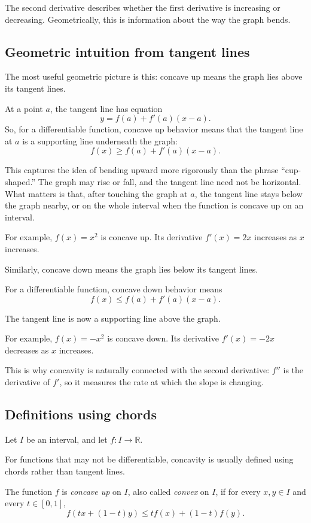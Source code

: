 \documentclass{essay}
\begin{document}
The second derivative describes whether the first derivative is increasing or decreasing. Geometrically, this is information about the way the graph bends.

\subsection{Geometric intuition from tangent lines}

The most useful geometric picture is this: concave up means the graph lies above its tangent lines.

At a point \(a\), the tangent line has equation
\[
y=f(a)+f'(a)(x-a).
\]
So, for a differentiable function, concave up behavior means that the tangent line at \(a\) is a supporting line underneath the graph:
\[
f(x)\geq f(a)+f'(a)(x-a).
\]

This captures the idea of bending upward more rigorously than the phrase ``cup-shaped.'' The graph may rise or fall, and the tangent line need not be horizontal. What matters is that, after touching the graph at \(a\), the tangent line stays below the graph nearby, or on the whole interval when the function is concave up on an interval.

For example, \(f(x)=x^2\) is concave up. Its derivative \(f'(x)=2x\) increases as \(x\) increases.

Similarly, concave down means the graph lies below its tangent lines.

For a differentiable function, concave down behavior means
\[
f(x)\leq f(a)+f'(a)(x-a).
\]

The tangent line is now a supporting line above the graph.

For example, \(f(x)=-x^2\) is concave down. Its derivative \(f'(x)=-2x\) decreases as \(x\) increases.

This is why concavity is naturally connected with the second derivative: \(f''\) is the derivative of \(f'\), so it measures the rate at which the slope is changing.

\subsection{Definitions using chords}

Let \(I\) be an interval, and let \(f:I\to\mathbb R\).

For functions that may not be differentiable, concavity is usually defined using chords rather than tangent lines.

The function \(f\) is \emph{concave up} on \(I\), also called \emph{convex} on \(I\), if for every \(x,y\in I\) and every \(t\in[0,1]\),
\[
f(tx+(1-t)y)
\leq
t f(x)+(1-t)f(y).
\]
\end{document}
